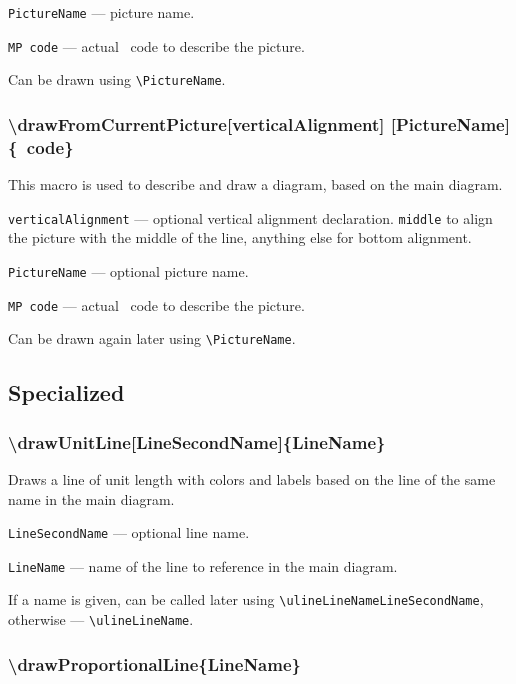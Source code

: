 \documentclass{ltxdoc}
\begin{document}
	\texttt{PictureName} — picture name.

	\texttt{MP code} — actual \METAPOST\ code to describe the picture.
	
	Can be drawn using \texttt{\textbackslash PictureName}.
	
\subsubsection{\textbackslash drawFromCurrentPicture[verticalAlignment] [PictureName] \{\METAPOST\ code\}}

	This macro is used to describe and draw a diagram, based on the main diagram.

	\texttt{verticalAlignment} — optional vertical alignment declaration. \texttt{middle} to align the picture with the middle of the line, anything else for bottom alignment.

	\texttt{PictureName} — optional picture name.

	\texttt{MP code} — actual \METAPOST\ code to describe the picture.
	
	Can be drawn again later using \texttt{\textbackslash PictureName}.


\subsection{Specialized}

\subsubsection{\textbackslash drawUnitLine[LineSecondName]\{LineName\}}

	Draws a line of unit length with colors and labels based on the line of the same name in the main diagram.

	\texttt{LineSecondName} — optional line name.
	
	\texttt{LineName} — name of the line to reference in the main diagram. 

	If a name is given, can be called later using \texttt{\textbackslash ulineLineNameLineSecondName}, otherwise — \texttt{\textbackslash ulineLineName}. 

\subsubsection{\textbackslash drawProportionalLine\{LineName\}}
\end{document}
